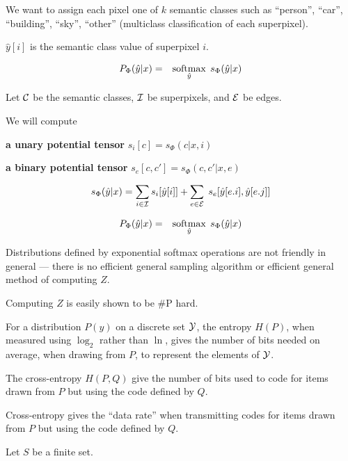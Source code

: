 {\vfill
We want to assign each pixel one of $k$ semantic classes such as ``person'', ``car'', ``building'', ``sky'', ``other'' (multiclass classification of each superpixel).

\vfill
$\hat{y}[i]$ is the semantic class value of superpixel $i$.

\bigskip
{\color{red}
\begin{eqnarray*}
P_\Phi(\hat{y}|x) & = & \operatorname*{softmax}_{\hat{y}}\;s_\Phi(\hat{y}|x)
\end{eqnarray*}
}

\vfill
Let ${\cal C}$ be the semantic classes, ${\cal I}$ be superpixels, and ${\cal E}$ be edges.

\vfill
We will compute

\vfill {\bf a unary potential tensor} $s_i[c] = s_\Phi(c|x,i)$

\vfill
{\bf a binary potential tensor} $s_e[c,c'] = s_\Phi(c,c'|x,e)$

\vfill
$$s_\Phi(\hat{y}|x) = \sum_{i \in {\cal I}} s_i[\hat{y}[i]] + \sum_{e \in {\cal E}}\;s_e[\hat{y}[e.i],\hat{y}[e.j]]$$

\bigskip
{\color{red}
\begin{eqnarray*}
P_\Phi(\hat{y}|x) & = & \operatorname*{softmax}_{\hat{y}}\;s_\Phi(\hat{y}|x)
\end{eqnarray*}
}

\vfill
Distributions defined by exponential softmax operations are not friendly in general --- there is no efficient general sampling algorithm or efficient general method of computing $Z$.

\vfill
Computing $Z$ is easily shown to be \#P hard.



For a distribution $P(y)$ on a discrete set ${\cal Y}$, the entropy $H(P)$, when measured using $\log_2$ rather than $\ln$, gives the number of bits needed
on average, when drawing from $P$, to represent the elements of ${\cal Y}$.

\vfill
The cross-entropy $H(P,Q)$ give the number of bits used to code for items drawn from $P$ but using the code defined by $Q$.

\vfill
Cross-entropy gives the ``data rate'' when transmitting codes for items drawn from $P$ but using the code defined by $Q$.


Let $S$ be a finite set.

}
